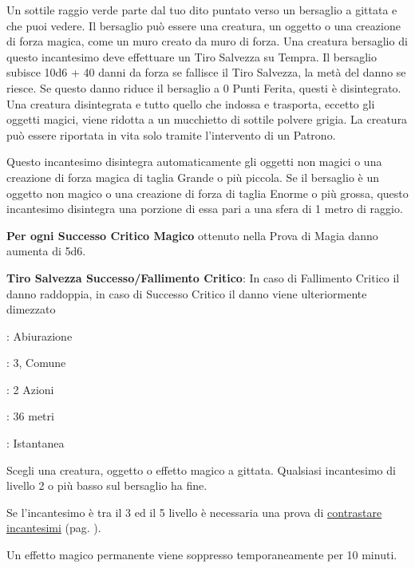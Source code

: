\begin{multicols}{2}
Un sottile raggio verde parte dal tuo dito puntato verso un bersaglio a gittata e che puoi vedere. Il bersaglio può essere una creatura, un oggetto o una creazione di forza magica, come un muro creato da muro di forza. Una creatura bersaglio di questo incantesimo deve effettuare un Tiro Salvezza su Tempra. Il bersaglio subisce 10d6 + 40 danni da forza se fallisce il Tiro Salvezza, la metà del danno se riesce. Se questo danno riduce il bersaglio a 0 Punti Ferita, questi è disintegrato. Una creatura disintegrata e tutto quello che indossa e trasporta, eccetto gli oggetti magici, viene ridotta a un mucchietto di sottile polvere grigia. La creatura può essere riportata in vita solo tramite l'intervento di un Patrono.

Questo incantesimo disintegra automaticamente gli oggetti non magici o una creazione di forza magica di taglia Grande o più piccola. Se il bersaglio è un oggetto non magico o una creazione di forza di taglia Enorme o più grossa, questo incantesimo disintegra una porzione di essa pari a una sfera di 1 metro di raggio.

\textbf{Per ogni Successo Critico Magico} ottenuto nella Prova di Magia danno aumenta di 5d6.

\textbf{Tiro Salvezza Successo/Fallimento Critico}: In caso di Fallimento Critico il danno raddoppia, in caso di Successo Critico il danno viene ulteriormente dimezzato


\hypertarget{dissolvimagie}{}
\noindent
\begin{description}[noitemsep, topsep=0pt, parsep=0pt, partopsep=0pt, leftmargin=0cm, labelwidth=1.3cm]
	\item[\textbf{Lista}]: Abiurazione
	\item[\textbf{Livello}]: 3, Comune
	\item[\textbf{Lancio}]: 2 Azioni
	\item[\textbf{Gittata}]: 36 metri
	\item[\textbf{Durata}]: Istantanea
\end{description}

Scegli una creatura, oggetto o effetto magico a gittata. Qualsiasi incantesimo di livello 2 o più basso sul bersaglio ha fine.

Se l'incantesimo è tra il 3 ed il 5 livello è necessaria una prova di \hyperlink{contrastareincantesimi}{contrastare incantesimi} (pag. \pageref{contrastareincantesimi}).

Un effetto magico permanente viene soppresso temporaneamente per 10 minuti.



\end{multicols}
